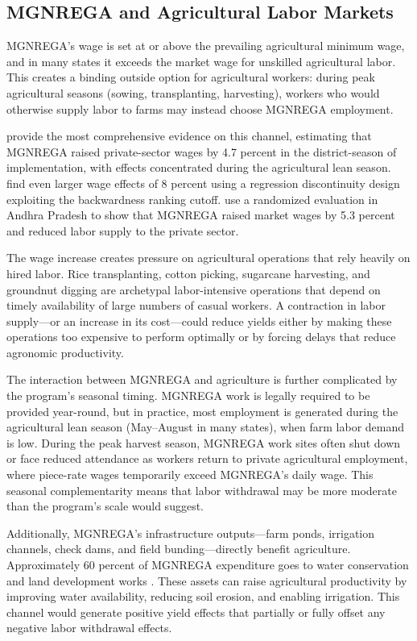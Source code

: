 \documentclass[12pt]{article}
\begin{document}
\subsection{MGNREGA and Agricultural Labor Markets}

MGNREGA's wage is set at or above the prevailing agricultural minimum wage, and in many states it exceeds the market wage for unskilled agricultural labor. This creates a binding outside option for agricultural workers: during peak agricultural seasons (sowing, transplanting, harvesting), workers who would otherwise supply labor to farms may instead choose MGNREGA employment.

\citet{imbert2015labor} provide the most comprehensive evidence on this channel, estimating that MGNREGA raised private-sector wages by 4.7 percent in the district-season of implementation, with effects concentrated during the agricultural lean season. \citet{berg2018can} find even larger wage effects of 8 percent using a regression discontinuity design exploiting the backwardness ranking cutoff. \citet{muralidharan2017general} use a randomized evaluation in Andhra Pradesh to show that MGNREGA raised market wages by 5.3 percent and reduced labor supply to the private sector.

The wage increase creates pressure on agricultural operations that rely heavily on hired labor. Rice transplanting, cotton picking, sugarcane harvesting, and groundnut digging are archetypal labor-intensive operations that depend on timely availability of large numbers of casual workers. A contraction in labor supply---or an increase in its cost---could reduce yields either by making these operations too expensive to perform optimally or by forcing delays that reduce agronomic productivity.

The interaction between MGNREGA and agriculture is further complicated by the program's seasonal timing. MGNREGA work is legally required to be provided year-round, but in practice, most employment is generated during the agricultural lean season (May--August in many states), when farm labor demand is low. During the peak harvest season, MGNREGA work sites often shut down or face reduced attendance as workers return to private agricultural employment, where piece-rate wages temporarily exceed MGNREGA's daily wage. This seasonal complementarity means that labor withdrawal may be more moderate than the program's scale would suggest.

Additionally, MGNREGA's infrastructure outputs---farm ponds, irrigation channels, check dams, and field bunding---directly benefit agriculture. Approximately 60 percent of MGNREGA expenditure goes to water conservation and land development works \citep{sukhtankar2017sweetening}. These assets can raise agricultural productivity by improving water availability, reducing soil erosion, and enabling irrigation. This channel would generate positive yield effects that partially or fully offset any negative labor withdrawal effects.
\end{document}
